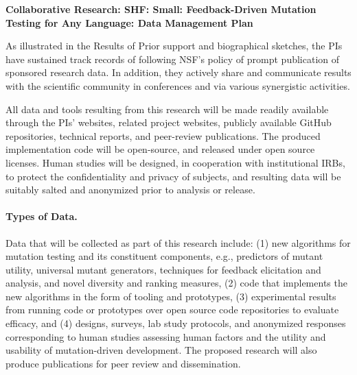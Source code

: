 \documentclass[11pt]{article}
\begin{document}
\begin{center}
{\Large\sf\textbf{Collaborative Research: SHF: Small: Feedback-Driven
    Mutation Testing for Any Language: Data Management Plan }} 
\end{center}


As illustrated in the Results of Prior support and biographical sketches, the
PIs have sustained track records of following NSF's policy of prompt publication
of sponsored research data.  In addition, they actively share and communicate
results with the scientific community in conferences and via various synergistic
activities.

All data and tools resulting from this research will be made readily available
through the PIs' websites, related project websites, publicly available GitHub
repositories, technical reports, and peer-review publications.  The produced
implementation code will be open-source, and released under open source
licenses.  Human studies will be designed, in cooperation with institutional
IRBs, to protect the confidentiality and privacy of subjects, and resulting data
will be suitably salted and anonymized prior to analysis or release.


\paragraph{Types of Data.} Data that will be collected as part of this research
include: (1) new algorithms for mutation testing and its constituent components,
e.g., predictors of mutant utility, universal mutant generators, techniques for
feedback elicitation and analysis, and novel diversity and ranking measures, (2)
code that implements the new algorithms in the form of tooling and prototypes,
(3) experimental results from running code or prototypes over open source code
repositories to evaluate efficacy, and (4) designs, surveys, lab study
protocols, and anonymized responses corresponding to human studies assessing
human factors and the utility and usability of mutation-driven development.  The
proposed research will also produce publications for peer review and
dissemination.
\end{document}
